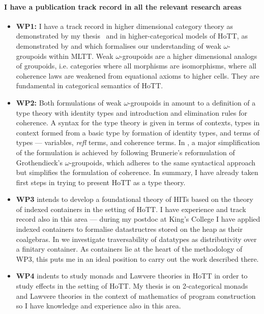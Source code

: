 \documentclass[a4paper]{article}
\newcommand{\mltt}{MLTT}
\begin{document}
\paragraph{I have a publication track record in all the relevant research areas}
\begin{itemize}
\item {\bf WP1:} I have a track record in higher dimensional category
  theory as demonstrated by my thesis~\cite{RypacekThesis} and in
  higher-categorical models of HoTT, as demonstrated by
   and 
  which formalises our understanding of weak $\omega$-groupoids within
  \mltt. Weak $\omega$-groupoids are a higher dimensional analogs of
  groupoids, i.e. categories where all morphisms are isomorphisms,
  where all coherence laws are weakened from equational axioms to
  higher cells. They are fundamental in categorical semantics of HoTT.

\item {\bf WP2:} Both formulations of weak $\omega$-groupoids in
   amount to a
  definition of a type theory with identity types and introduction and
  elimination rules for coherence. A syntax for the type theory is
  given in terms of contexts, types in context formed from a basic
  type by formation of identity types, and terms of types ---
  variables, \emph{refl} terms, and coherence terms. In
  , a major simplification of the
  formulation is achieved by following Brunerie's reformulation of
  Grothendieck's $\omega$-groupoids, which adheres to the same
  syntactical approach but simplifies the formulation of coherence. In
  summary, I have already taken first steps in trying to present HoTT
  as a type theory.

\item {\bf WP3} intends to develop a foundational theory of HITs based
  on the theory of indexed containers in the setting of HoTT. I have
  experience and track record also in this area --- during my postdoc
  at King's College I have applied indexed containers to formalise
  datastructres stored on the heap as their coalgebras. In
   we investigate traversability of
  datatypes as distributivity over a finitary container. As containers
  lie at the heart of the methodology of WP3, this puts me in an ideal
  position to carry out the work described there. 

\item {\bf WP4} indents to study monads and Lawvere theories in HoTT
  in order to study effects in the setting of HoTT.  My thesis
   is on 2-categorical monads and Lawvere
  theories in the context of mathematics of program construction so I
  have knowledge and experience also in this area.
\end{itemize}
\end{document}
